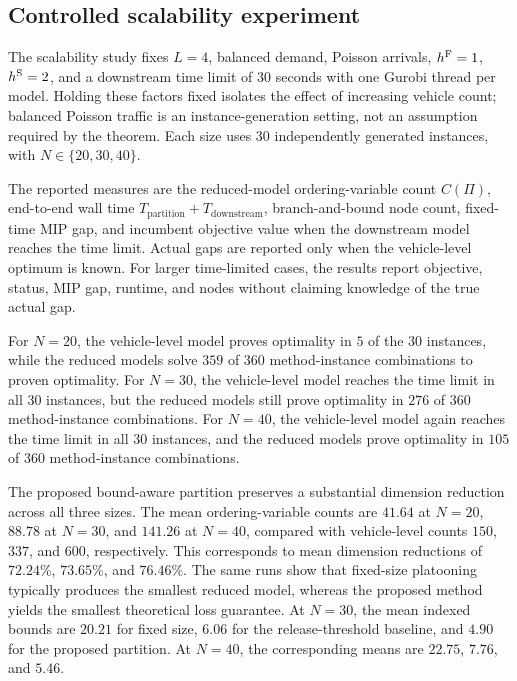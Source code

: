 \subsection{Controlled scalability experiment}

The scalability study fixes \(L=4\), balanced demand, Poisson arrivals, \(h^{\mathrm{F}}=1\), \(h^{\mathrm{S}}=2\), and a downstream time limit of \(30\) seconds with one Gurobi thread per model. Holding these factors fixed isolates the effect of increasing vehicle count; balanced Poisson traffic is an instance-generation setting, not an assumption required by the theorem. Each size uses \(30\) independently generated instances, with \(N\in\{20,30,40\}\).

The reported measures are the reduced-model ordering-variable count \(C(\Pi)\), end-to-end wall time \(T_{\mathrm{partition}}+T_{\mathrm{downstream}}\), branch-and-bound node count, fixed-time MIP gap, and incumbent objective value when the downstream model reaches the time limit. Actual gaps are reported only when the vehicle-level optimum is known. For larger time-limited cases, the results report objective, status, MIP gap, runtime, and nodes without claiming knowledge of the true actual gap.

For \(N=20\), the vehicle-level model proves optimality in \(5\) of the \(30\) instances, while the reduced models solve \(359\) of \(360\) method-instance combinations to proven optimality. For \(N=30\), the vehicle-level model reaches the time limit in all \(30\) instances, but the reduced models still prove optimality in \(276\) of \(360\) method-instance combinations. For \(N=40\), the vehicle-level model again reaches the time limit in all \(30\) instances, and the reduced models prove optimality in \(105\) of \(360\) method-instance combinations.

The proposed bound-aware partition preserves a substantial dimension reduction across all three sizes. The mean ordering-variable counts are \(41.64\) at \(N=20\), \(88.78\) at \(N=30\), and \(141.26\) at \(N=40\), compared with vehicle-level counts \(150\), \(337\), and \(600\), respectively. This corresponds to mean dimension reductions of \(72.24\%\), \(73.65\%\), and \(76.46\%\). The same runs show that fixed-size platooning typically produces the smallest reduced model, whereas the proposed method yields the smallest theoretical loss guarantee. At \(N=30\), the mean indexed bounds are \(20.21\) for fixed size, \(6.06\) for the release-threshold baseline, and \(4.90\) for the proposed partition. At \(N=40\), the corresponding means are \(22.75\), \(7.76\), and \(5.46\).

